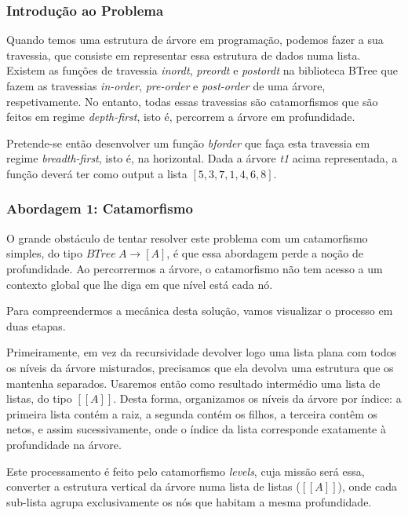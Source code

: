 \documentclass[11pt, a4paper, fleqn]{article}
\begin{document}
\subsubsection*{Introdução ao Problema}

\noindent Quando temos uma estrutura de árvore em programação, podemos fazer a sua travessia, que consiste em representar essa estrutura de dados numa lista.
Existem as funções de travessia \textit{inordt}, \textit{preordt} e \textit{postordt} na biblioteca BTree que fazem as travessias \textit{in-order}, \textit{pre-order} e \textit{post-order} de uma árvore, respetivamente.
No entanto, todas essas travessias são catamorfismos que são feitos em regime \textit{depth-first}, isto é, percorrem a árvore em profundidade.

\noindent Pretende-se então desenvolver um função \textit{bforder} que faça esta travessia em regime \textit{breadth-first}, isto é, na horizontal.
Dada a árvore \textit{t1} acima representada, a função deverá ter como output a lista $[5, 3, 7, 1, 4, 6, 8]$.


\subsubsection*{Abordagem 1: Catamorfismo}

\noindent O grande obstáculo de tentar resolver este problema com um catamorfismo simples, do tipo $BTree \ A \to [A]$, é que essa abordagem perde a noção de profundidade.
Ao percorrermos a árvore, o catamorfismo não tem acesso a um contexto global que lhe diga em que nível está cada nó.

\noindent Para compreendermos a mecânica desta solução, vamos visualizar o processo em duas etapas.

\noindent Primeiramente, em vez da recursividade devolver logo uma lista plana com todos os níveis da árvore misturados, precisamos que ela devolva uma estrutura que os mantenha separados.
Usaremos então como resultado intermédio uma lista de listas, do tipo $[[A]]$.
Desta forma, organizamos os níveis da árvore por índice: a primeira lista contém a raiz, a segunda contém os filhos, a terceira contêm os netos, e assim sucessivamente, onde o índice da lista corresponde exatamente à profundidade na árvore.

\noindent Este processamento é feito pelo catamorfismo \textit{levels}, cuja missão será essa, converter a estrutura vertical da árvore numa lista de listas ($[[A]]$), onde cada sub-lista agrupa exclusivamente os nós que habitam a mesma profundidade.
\end{document}
